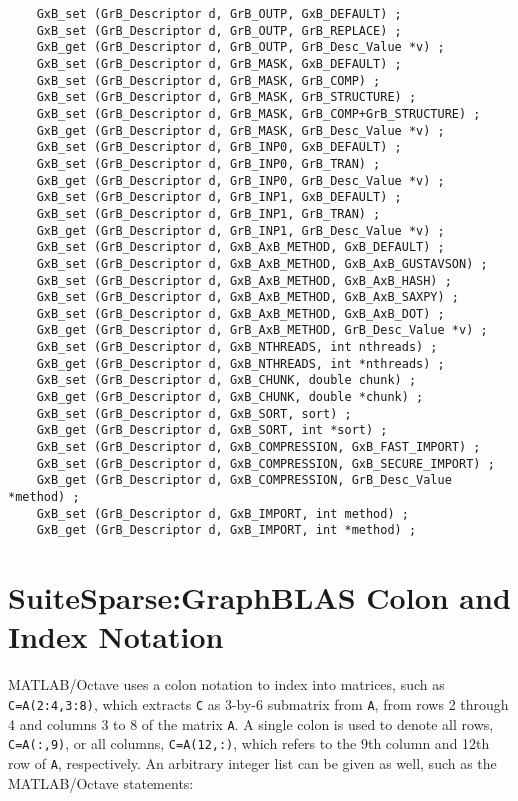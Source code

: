 \documentclass[12pt]{article}
\begin{document}
    {\footnotesize
    \begin{verbatim}
    GxB_set (GrB_Descriptor d, GrB_OUTP, GxB_DEFAULT) ;
    GxB_set (GrB_Descriptor d, GrB_OUTP, GrB_REPLACE) ;
    GxB_get (GrB_Descriptor d, GrB_OUTP, GrB_Desc_Value *v) ;
    GxB_set (GrB_Descriptor d, GrB_MASK, GxB_DEFAULT) ;
    GxB_set (GrB_Descriptor d, GrB_MASK, GrB_COMP) ;
    GxB_set (GrB_Descriptor d, GrB_MASK, GrB_STRUCTURE) ;
    GxB_set (GrB_Descriptor d, GrB_MASK, GrB_COMP+GrB_STRUCTURE) ;
    GxB_get (GrB_Descriptor d, GrB_MASK, GrB_Desc_Value *v) ;
    GxB_set (GrB_Descriptor d, GrB_INP0, GxB_DEFAULT) ;
    GxB_set (GrB_Descriptor d, GrB_INP0, GrB_TRAN) ;
    GxB_get (GrB_Descriptor d, GrB_INP0, GrB_Desc_Value *v) ;
    GxB_set (GrB_Descriptor d, GrB_INP1, GxB_DEFAULT) ;
    GxB_set (GrB_Descriptor d, GrB_INP1, GrB_TRAN) ;
    GxB_get (GrB_Descriptor d, GrB_INP1, GrB_Desc_Value *v) ;
    GxB_set (GrB_Descriptor d, GxB_AxB_METHOD, GxB_DEFAULT) ;
    GxB_set (GrB_Descriptor d, GxB_AxB_METHOD, GxB_AxB_GUSTAVSON) ;
    GxB_set (GrB_Descriptor d, GxB_AxB_METHOD, GxB_AxB_HASH) ;
    GxB_set (GrB_Descriptor d, GxB_AxB_METHOD, GxB_AxB_SAXPY) ;
    GxB_set (GrB_Descriptor d, GxB_AxB_METHOD, GxB_AxB_DOT) ;
    GxB_get (GrB_Descriptor d, GrB_AxB_METHOD, GrB_Desc_Value *v) ;
    GxB_set (GrB_Descriptor d, GxB_NTHREADS, int nthreads) ;
    GxB_get (GrB_Descriptor d, GxB_NTHREADS, int *nthreads) ;
    GxB_set (GrB_Descriptor d, GxB_CHUNK, double chunk) ;
    GxB_get (GrB_Descriptor d, GxB_CHUNK, double *chunk) ;
    GxB_set (GrB_Descriptor d, GxB_SORT, sort) ;
    GxB_get (GrB_Descriptor d, GxB_SORT, int *sort) ;
    GxB_set (GrB_Descriptor d, GxB_COMPRESSION, GxB_FAST_IMPORT) ;
    GxB_set (GrB_Descriptor d, GxB_COMPRESSION, GxB_SECURE_IMPORT) ;
    GxB_get (GrB_Descriptor d, GxB_COMPRESSION, GrB_Desc_Value *method) ;
    GxB_set (GrB_Descriptor d, GxB_IMPORT, int method) ;
    GxB_get (GrB_Descriptor d, GxB_IMPORT, int *method) ; \end{verbatim} }

\newpage
\section{SuiteSparse:GraphBLAS Colon and Index Notation} %
\label{colon}

MATLAB/Octave uses a colon notation to index into matrices, such as
\verb'C=A(2:4,3:8)', which extracts \verb'C' as 3-by-6 submatrix from \verb'A',
from rows 2 through 4 and columns 3 to 8 of the matrix \verb'A'.  A single
colon is used to denote all rows, \verb'C=A(:,9)', or all columns,
\verb'C=A(12,:)', which refers to the 9th column and 12th row of \verb'A',
respectively.  An arbitrary integer list can be given as well, such as the
MATLAB/Octave statements:
\end{document}
